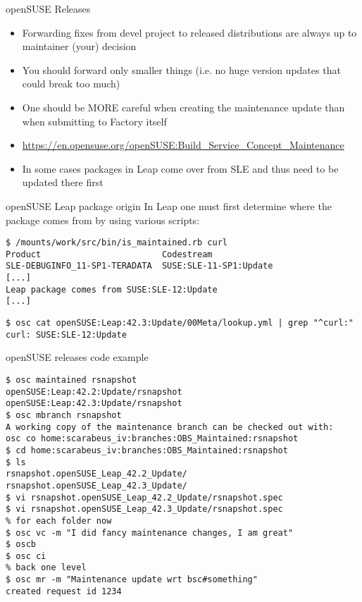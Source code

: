 \documentclass{beamer}
\begin{document}
\begin{frame}[t]{openSUSE Releases}
	\begin{itemize}
	\item Forwarding fixes from devel project to released distributions are always up to maintainer (your) decision
	\item You should forward only smaller things (i.e. no huge version updates that could break too much)
	\item One should be MORE careful when creating the maintenance update than when submitting to Factory itself
	\item \url{https://en.opensuse.org/openSUSE:Build\_Service\_Concept\_Maintenance}
	\item In some cases packages in Leap come over from SLE and thus need to be updated there first
	\end{itemize}
\end{frame}

\begin{frame}[fragile]{openSUSE Leap package origin}
In Leap one must first determine where the package comes from by using various
scripts:
\begin{small}
\begin{verbatim}$ /mounts/work/src/bin/is_maintained.rb curl
Product                        Codestream
SLE-DEBUGINFO_11-SP1-TERADATA  SUSE:SLE-11-SP1:Update
[...]
Leap package comes from SUSE:SLE-12:Update
[...]\end{verbatim}
\end{small}
\begin{small}
\begin{verbatim}$ osc cat openSUSE:Leap:42.3:Update/00Meta/lookup.yml | grep "^curl:"
curl: SUSE:SLE-12:Update\end{verbatim}
\end{small}
\end{frame}

\begin{frame}[fragile]{openSUSE releases code example}
	\begin{scriptsize}
\begin{verbatim}
$ osc maintained rsnapshot
openSUSE:Leap:42.2:Update/rsnapshot
openSUSE:Leap:42.3:Update/rsnapshot
$ osc mbranch rsnapshot
A working copy of the maintenance branch can be checked out with:
osc co home:scarabeus_iv:branches:OBS_Maintained:rsnapshot
$ cd home:scarabeus_iv:branches:OBS_Maintained:rsnapshot
$ ls
rsnapshot.openSUSE_Leap_42.2_Update/  rsnapshot.openSUSE_Leap_42.3_Update/
$ vi rsnapshot.openSUSE_Leap_42.2_Update/rsnapshot.spec
$ vi rsnapshot.openSUSE_Leap_42.3_Update/rsnapshot.spec
% for each folder now
$ osc vc -m "I did fancy maintenance changes, I am great"
$ oscb
$ osc ci
% back one level
$ osc mr -m "Maintenance update wrt bsc#something"
created request id 1234
\end{verbatim}
	\end{scriptsize}
\end{frame}
\end{document}

